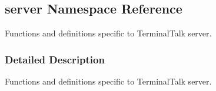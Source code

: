\hypertarget{namespaceserver}{}\subsection{server Namespace Reference}
\label{namespaceserver}


Functions and definitions specific to Terminal\+Talk server.  




\subsubsection{Detailed Description}
Functions and definitions specific to Terminal\+Talk server. 